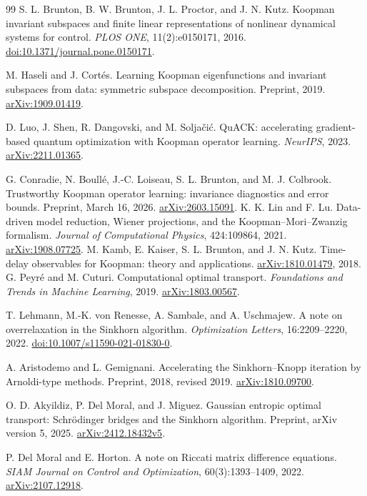\documentclass[journal]{IEEEtran}
\theoremstyle{definition}
\begin{document}
\begin{thebibliography}{99}
 S. L. Brunton, B. W. Brunton, J. L. Proctor, and J. N. Kutz.
Koopman invariant subspaces and finite linear representations of nonlinear
dynamical systems for control. \emph{PLOS ONE}, 11(2):e0150171, 2016.
\href{https://doi.org/10.1371/journal.pone.0150171}{doi:10.1371/journal.pone.0150171}.

 M. Haseli and J. Cort\'es.
Learning Koopman eigenfunctions and invariant subspaces from data:
symmetric subspace decomposition. Preprint, 2019.
\href{https://arxiv.org/abs/1909.01419}{arXiv:1909.01419}.

 D. Luo, J. Shen, R. Dangovski, and M. Solja\v{c}i\'c.
QuACK: accelerating gradient-based quantum optimization with Koopman operator learning.
\emph{NeurIPS}, 2023.
\href{https://arxiv.org/abs/2211.01365}{arXiv:2211.01365}.

 G. Conradie, N. Boull\'e, J.-C. Loiseau,
S. L. Brunton, and M. J. Colbrook.
Trustworthy Koopman operator learning: invariance diagnostics and error bounds.
Preprint, March 16, 2026.
\href{https://arxiv.org/abs/2603.15091}{arXiv:2603.15091}.
 K. K. Lin and F. Lu.
Data-driven model reduction, Wiener projections, and the Koopman--Mori--Zwanzig formalism.
\emph{Journal of Computational Physics}, 424:109864, 2021.
\href{https://arxiv.org/abs/1908.07725}{arXiv:1908.07725}.
 M. Kamb, E. Kaiser, S. L. Brunton, and J. N. Kutz.
Time-delay observables for Koopman: theory and applications.
\href{https://arxiv.org/abs/1810.01479}{arXiv:1810.01479}, 2018.
 G. Peyr\'e and M. Cuturi.
Computational optimal transport.
\emph{Foundations and Trends in Machine Learning}, 2019.
\href{https://arxiv.org/abs/1803.00567}{arXiv:1803.00567}.

 T. Lehmann, M.-K. von Renesse, A. Sambale, and A. Uschmajew.
A note on overrelaxation in the Sinkhorn algorithm.
\emph{Optimization Letters}, 16:2209--2220, 2022.
\href{https://doi.org/10.1007/s11590-021-01830-0}{doi:10.1007/s11590-021-01830-0}.

 A. Aristodemo and L. Gemignani.
Accelerating the Sinkhorn--Knopp iteration by Arnoldi-type methods.
Preprint, 2018, revised 2019.
\href{https://arxiv.org/abs/1810.09700}{arXiv:1810.09700}.

 O. D. Akyildiz, P. Del Moral, and J. Miguez.
Gaussian entropic optimal transport: Schr\"odinger bridges and the Sinkhorn algorithm.
Preprint, arXiv version 5, 2025.
\href{https://arxiv.org/abs/2412.18432v5}{arXiv:2412.18432v5}.

 P. Del Moral and E. Horton.
A note on Riccati matrix difference equations.
\emph{SIAM Journal on Control and Optimization}, 60(3):1393--1409, 2022.
\href{https://arxiv.org/abs/2107.12918}{arXiv:2107.12918}.

\end{thebibliography}
\end{document}
